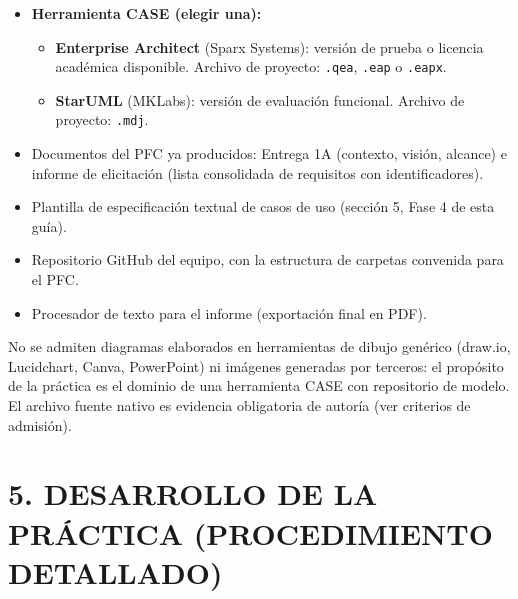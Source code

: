 \documentclass[11pt]{article}
\begin{document}
\begin{itemize}[leftmargin=18pt,itemsep=2pt]
  \item \textbf{Herramienta CASE (elegir una):}
    \begin{itemize}[leftmargin=14pt,itemsep=1pt]
      \item \textbf{Enterprise Architect} (Sparx Systems): versión de prueba o licencia académica disponible. Archivo de proyecto: \texttt{.qea}, \texttt{.eap} o \texttt{.eapx}.
      \item \textbf{StarUML} (MKLabs): versión de evaluación funcional. Archivo de proyecto: \texttt{.mdj}.
    \end{itemize}
  \item Documentos del PFC ya producidos: Entrega 1A (contexto, visión, alcance) e informe de elicitación (lista consolidada de requisitos con identificadores).
  \item Plantilla de especificación textual de casos de uso (sección 5, Fase 4 de esta guía).
  \item Repositorio GitHub del equipo, con la estructura de carpetas convenida para el PFC.
  \item Procesador de texto para el informe (exportación final en PDF).
\end{itemize}

\begin{tcolorbox}[colback=lightgold,colframe=gold,boxrule=0.8pt,arc=2mm,
  title=\textbf{Nota sobre herramientas},fonttitle=\bfseries]
No se admiten diagramas elaborados en herramientas de dibujo genérico (draw.io, Lucidchart, Canva, PowerPoint) ni imágenes generadas por terceros: el propósito de la práctica es el dominio de una herramienta CASE con repositorio de modelo. El archivo fuente nativo es evidencia obligatoria de autoría (ver criterios de admisión).
\end{tcolorbox}

\section*{\textcolor{utegreendk}{5. DESARROLLO DE LA PRÁCTICA (PROCEDIMIENTO DETALLADO)}}
\end{document}
